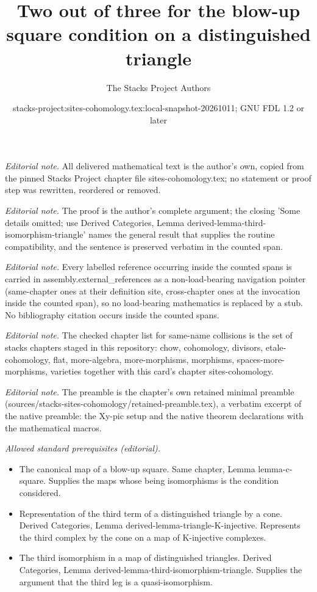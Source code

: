 \documentclass[10pt,a4paper]{amsart}
\title{Two out of three for the blow-up square condition on a distinguished triangle}
\author{The Stacks Project Authors}
\date{stacks-project:sites-cohomology.tex:local-snapshot-20261011; GNU FDL 1.2 or later}
\theoremstyle{plain}
\theoremstyle{definition}
\theoremstyle{remark}
\numberwithin{equation}{subsection}
\begin{document}
\maketitle
\noindent\textit{Editorial note.} All delivered mathematical text is the author's own, copied from the pinned Stacks Project chapter file sites-cohomology.tex; no statement or proof step was rewritten, reordered or removed.\par\medskip
\noindent\textit{Editorial note.} The proof is the author's complete argument; the closing 'Some details omitted; use Derived Categories, Lemma derived-lemma-third-isomorphism-triangle' names the general result that supplies the routine compatibility, and the sentence is preserved verbatim in the counted span.\par\medskip
\noindent\textit{Editorial note.} Every labelled reference occurring inside the counted spans is carried in assembly.external\_references as a non-load-bearing navigation pointer (same-chapter ones at their definition site, cross-chapter ones at the invocation inside the counted span), so no load-bearing mathematics is replaced by a stub. No bibliography citation occurs inside the counted spans.\par\medskip
\noindent\textit{Editorial note.} The checked chapter list for same-name collisions is the set of stacks chapters staged in this repository: chow, cohomology, divisors, etale-cohomology, flat, more-algebra, more-morphisms, morphisms, spaces-more-morphisms, varieties together with this card's chapter sites-cohomology.\par\medskip
\noindent\textit{Editorial note.} The preamble is the chapter's own retained minimal preamble (sources/stacks-sites-cohomology/retained-preamble.tex), a verbatim excerpt of the native preamble: the Xy-pic setup and the native theorem declarations with the mathematical macros.\par\medskip
\noindent\textit{Allowed standard prerequisites (editorial).}\begin{itemize}
\item The canonical map of a blow-up square. Same chapter, Lemma lemma-c-square. Supplies the maps whose being isomorphisms is the condition considered.
\item Representation of the third term of a distinguished triangle by a cone. Derived Categories, Lemma derived-lemma-triangle-K-injective. Represents the third complex by the cone on a map of K-injective complexes.
\item The third isomorphism in a map of distinguished triangles. Derived Categories, Lemma derived-lemma-third-isomorphism-triangle. Supplies the argument that the third leg is a quasi-isomorphism.
\end{itemize}\medskip
\end{document}
